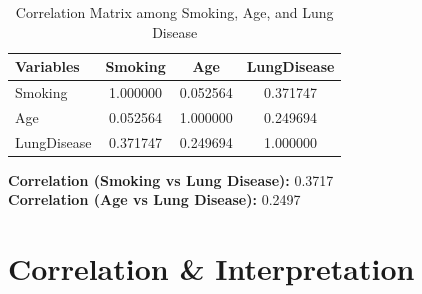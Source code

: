 \documentclass[12pt,a4paper]{report}
\begin{document}
\begin{table}[h!]
\centering
\caption{Correlation Matrix among Smoking, Age, and Lung Disease}
\begin{tabular}{lccc}
\hline
\textbf{Variables} & \textbf{Smoking} & \textbf{Age} & \textbf{LungDisease} \\
\hline
Smoking     & 1.000000 & 0.052564 & 0.371747 \\
Age         & 0.052564 & 1.000000 & 0.249694 \\
LungDisease & 0.371747 & 0.249694 & 1.000000 \\
\hline
\end{tabular}
\end{table}

\vspace{6pt}
\noindent
\textbf{Correlation (Smoking vs Lung Disease):} 0.3717 \\
\textbf{Correlation (Age vs Lung Disease):} 0.2497
\section*{Correlation \& Interpretation}
\end{document}
